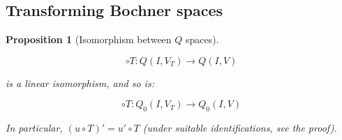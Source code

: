\documentclass[english,a4paper,9pt,oneside]{scrbook}	%
\theoremstyle{break}
\newtheorem{prop}[equation]{Proposition}
\theoremstyle{remark}
\newcommand{\norm}[1]{\left\lVert#1\right\rVert}
\newcommand{\tr}{\text{tr}}
\newcommand{\tred}[1]{\textcolor{red}{#1}}
\begin{document}
\begin{appendices}
%
%
%
%
%
%
%
%
%
%		
%

\section{Transforming Bochner spaces}

\begin{prop}[Isomorphism between $Q$ spaces]
\label{prop:change_boch}

$$\circ T : Q(I,V_T)\rightarrow Q(I,V)$$

is a linear isomorphism, and so is:

$$\circ T : Q_0(I,V_T)\rightarrow Q_0(I,V)$$

In particular, $(u\circ T)' = u'\circ T$ (under suitable identifications, see the proof).


\end{prop}
\end{appendices}
\end{document}
